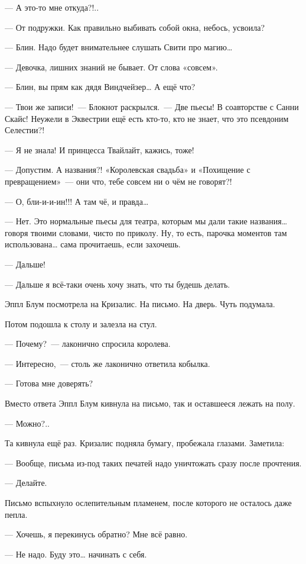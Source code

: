 \documentclass[fontsize=11pt,a5paper,titlepage=firstcover]{scrbook}
\begin{document}
--- А это-то мне откуда?!..

--- От подружки. Как правильно выбивать собой окна, небось, усвоила?

--- Блин. Надо будет внимательнее слушать Свити про магию{\ldots}

--- Девочка, лишних знаний не бывает. От слова «совсем».

--- Блин, вы прям как дядя Виндчейзер{\ldots} А ещё что?

--- Твои же записи!~--- Блокнот раскрылся.~--- Две пьесы! В соавторстве с Санни Скайс! Неужели в Эквестрии ещё есть кто-то, кто не знает, что это псевдоним Селестии?!

--- Я не знала! И принцесса Твайлайт, кажись, тоже!

--- Допустим. А названия?! «Королевская свадьба» и «Похищение с превращением»~--- они что, тебе совсем ни о чём не говорят?!

--- О, бли-и-и-ин!!! А там чё, и правда{\ldots}

--- Нет. Это нормальные пьесы для театра, которым мы дали такие названия{\ldots} говоря твоими словами, чисто по приколу. Ну, то есть, парочка моментов там использована{\ldots} сама прочитаешь, если захочешь.

--- Дальше!

--- Дальше я всё-таки очень хочу знать, что ты будешь делать.

Эппл Блум посмотрела на Кризалис. На письмо. На дверь. Чуть подумала.

Потом подошла к столу и залезла на стул.

--- Почему?~--- лаконично спросила королева.

--- Интересно,~--- столь же лаконично ответила кобылка.

--- Готова мне доверять?

Вместо ответа Эппл Блум кивнула на письмо, так и оставшееся лежать на полу.

--- Можно?..

Та кивнула ещё раз. Кризалис подняла бумагу, пробежала глазами. Заметила:

--- Вообще, письма из-под таких печатей надо уничтожать сразу после прочтения.

--- Делайте.

Письмо вспыхнуло ослепительным пламенем, после которого не осталось даже пепла.

--- Хочешь, я перекинусь обратно? Мне всё равно.

--- Не надо. Буду это{\ldots} начинать с себя.
\end{document}
